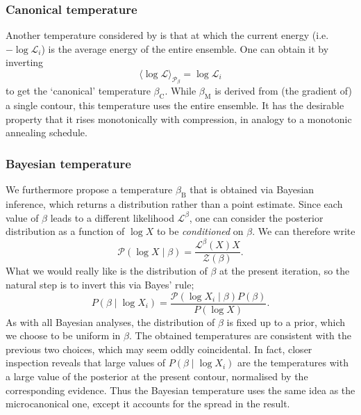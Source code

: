 \documentclass[usenatbib]{mnras}
\newcommand{\Like}{\mathcal{L}}
\begin{document}
\subsubsection{Canonical temperature}\label{sec:canonical_temperature}
Another temperature considered by \citet{demons} is that at which the current energy (i.e. $-\log \Like_i$) is the average energy of the entire ensemble. One can obtain it by inverting 
\begin{equation}
    \langle \log \Like \rangle_{\mathcal{P}_\beta} = \log \Like_i
\end{equation}
to get the `canonical' temperature $\beta_\mathrm{C}$. While $\beta_\mathrm{M}$ is derived from (the gradient of) a single contour, this temperature uses the entire ensemble. It has the desirable property that it rises monotonically with compression, in analogy to a monotonic annealing schedule.

\subsubsection{Bayesian temperature}\label{sec:bayesian_temperature}
We furthermore propose a temperature $\beta_\mathrm{B}$ that is obtained via Bayesian inference, which returns a distribution rather than a point estimate. Since each value of $\beta$ leads to a different likelihood $\Like^{\beta}$, one can consider the posterior distribution as a function of $\log X$ to be \textit{conditioned} on $\beta$. We can therefore write
\begin{equation}
   \mathcal{P}(\log X \mid \beta) = \frac{\Like^{\beta}(X) X}{\mathcal{Z(\beta)}}.
\end{equation}
What we would really like is the distribution of $\beta$ at the present iteration, so the natural step is to invert this via Bayes' rule;
\begin{equation}
    P\left(\beta \mid \log X_i\right) = \frac{\mathcal{P}\left(\log X_i \mid \beta\right) P\left(\beta\right)}{P\left(\log X\right)}.
\end{equation}
As with all Bayesian analyses, the distribution of $\beta$ is fixed up to a prior, which we choose to be uniform in $\beta$. The obtained temperatures are consistent with the previous two choices, which may seem oddly coincidental. In fact, closer inspection reveals that large values of $P(\beta \mid \log X_i)$ are the temperatures with a large value of the posterior at the present contour, normalised by the corresponding evidence. Thus the Bayesian temperature uses the same idea as the microcanonical one, except it accounts for the spread in the result.
\end{document}
